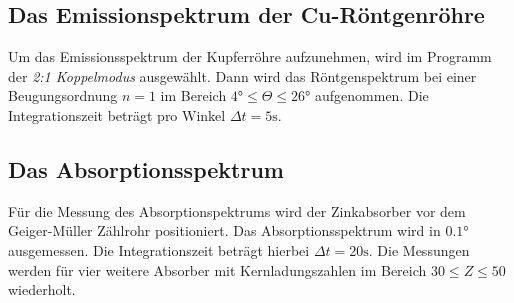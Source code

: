 \subsection{Das Emissionspektrum der Cu-Röntgenröhre}
Um das Emissionsspektrum der Kupferröhre aufzunehmen, wird im Programm der \textit{2:1 Koppelmodus}
ausgewählt. Dann wird das Röntgenspektrum bei einer Beugungsordnung $n=1$ im Bereich
$4 \si{\degree} \leq \Theta \leq 26 \si{\degree}$ aufgenommen. Die Integrationszeit
beträgt pro Winkel $\Delta t = 5 \si{\second}$.

\subsection{Das Absorptionsspektrum}
Für die Messung des Absorptionspektrums wird der Zinkabsorber vor dem Geiger-Müller
Zählrohr positioniert. Das Absorptionsspektrum wird in $0.1 \si{\degree}$ ausgemessen.
Die Integrationszeit beträgt hierbei $\Delta t = 20 \si{\second}$.
Die Messungen werden für vier weitere Absorber mit Kernladungszahlen im Bereich
$30 \leq Z \leq 50$ wiederholt.
